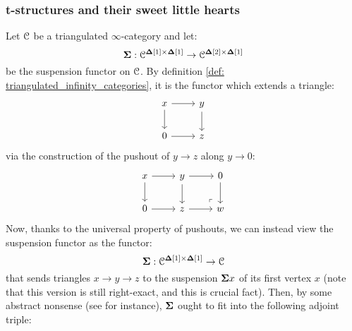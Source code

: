         \subsubsection{t-structures and their sweet little hearts}
            \begin{remark} \label{remark: suspensions_and_loops}
                Let $\C$ be a triangulated $\infty$-category and let:
                    $$\suspension: \C^{\simp[1] \x \simp[1]} \to \C^{\simp[2] \x \simp[1]}$$
                be the suspension functor on $\C$. By definition \ref{def: triangulated_infinity_categories}, it is the functor which extends a triangle:
                    $$
                        \begin{tikzcd}
                        	x & y \\
                        	0 & z
                        	\arrow[from=1-1, to=2-1]
                        	\arrow[from=1-1, to=1-2]
                        	\arrow[from=1-2, to=2-2]
                        	\arrow[from=2-1, to=2-2]
                        \end{tikzcd}
                    $$
                via the construction of the pushout of $y \to z$ along $y \to 0$:
                    $$
                        \begin{tikzcd}
                        	x & y & 0 \\
                        	0 & z & w
                        	\arrow[from=1-1, to=2-1]
                        	\arrow[from=1-1, to=1-2]
                        	\arrow[from=1-2, to=2-2]
                        	\arrow[from=2-1, to=2-2]
                        	\arrow[from=1-2, to=1-3]
                        	\arrow[from=1-3, to=2-3]
                        	\arrow[from=2-2, to=2-3]
                        	\arrow["\lrcorner"{anchor=center, pos=0.125, rotate=180}, draw=none, from=2-3, to=1-2]
                        \end{tikzcd}
                    $$
                Now, thanks to the universal property of pushouts, we can instead view the suspension functor as the functor:
                    $$\suspension: \C^{\simp[1] \x \simp[1]} \to \C$$
                that sends triangles $x \to y \to z$ to the suspension $\suspension x$ of its first vertex $x$ (note that this version is still right-exact, and this is crucial fact). Then, by some abstract nonsense (see \cite[Section 3]{nlab:infinity-1-limit} for instance), $\suspension$ ought to fit into the following adjoint triple:
                    $$
                        \begin{tikzcd}

\end{tikzcd}$$
\end{remark}
